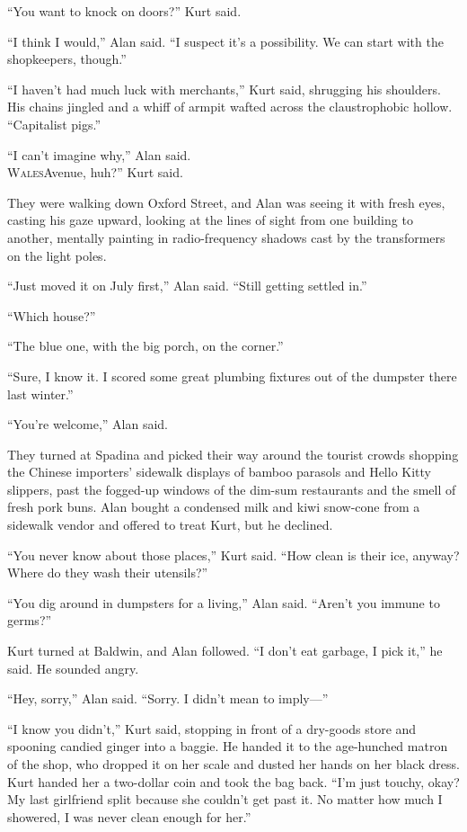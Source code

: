 \documentclass{article}
\begin{document}
``You want to knock on doors?'' Kurt said.

``I think I would,'' Alan said.  ``I suspect it's a possibility.  We
can start with the shopkeepers, though.''

``I haven't had much luck with merchants,'' Kurt said, shrugging his
shoulders.  His chains jingled and a whiff of armpit wafted across the
claustrophobic hollow.  ``Capitalist pigs.''

``I can't imagine why,'' Alan said.
\\
\lettrine[lines=3, lhang=.5, nindent=0pt, findent=2pt]{W}{ales}Avenue, huh?'' Kurt said.

They were walking down Oxford Street, and Alan was seeing it with
fresh eyes, casting his gaze upward, looking at the lines of sight
from one building to another, mentally painting in radio-frequency
shadows cast by the transformers on the light poles.

``Just moved it on July first,'' Alan said.  ``Still getting settled
in.''

``Which house?''

``The blue one, with the big porch, on the corner.''

``Sure, I know it.  I scored some great plumbing fixtures out of the
dumpster there last winter.''

``You're welcome,'' Alan said.

They turned at Spadina and picked their way around the tourist crowds
shopping the Chinese importers' sidewalk displays of bamboo parasols
and Hello Kitty slippers, past the fogged-up windows of the dim-sum
restaurants and the smell of fresh pork buns.  Alan bought a condensed
milk and kiwi snow-cone from a sidewalk vendor and offered to treat
Kurt, but he declined.

``You never know about those places,'' Kurt said.  ``How clean is
their ice, anyway?  Where do they wash their utensils?''

``You dig around in dumpsters for a living,'' Alan said.  ``Aren't you
immune to germs?''

Kurt turned at Baldwin, and Alan followed.  ``I don't eat garbage, I
pick it,'' he said.  He sounded angry.

``Hey, sorry,'' Alan said.  ``Sorry.  I didn't mean to imply---''

``I know you didn't,'' Kurt said, stopping in front of a dry-goods
store and spooning candied ginger into a baggie.  He handed it to the
age-hunched matron of the shop, who dropped it on her scale and dusted
her hands on her black dress.  Kurt handed her a two-dollar coin and
took the bag back.  ``I'm just touchy, okay?  My last girlfriend split
because she couldn't get past it.  No matter how much I showered, I
was never clean enough for her.''
\end{document}
